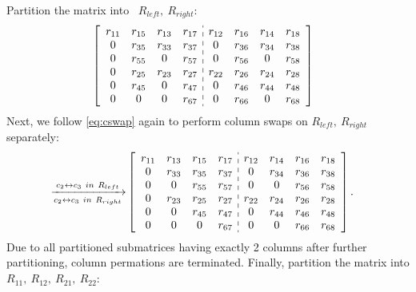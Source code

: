 \documentclass[12pt]{article}
\numberwithin{equation}{section}
\begin{document}
Partition the matrix into \ $R_{left}, \ R_{right}$:
 \begin{align*}
&\begin{bmatrix}
\begin{array}{cccc:cccc}
 r_{11} & r_{15} & r_{13} & r_{17} & r_{12} & r_{16} & r_{14} & r_{18}\\
 0      & r_{35} & r_{33} & r_{37} & 0      & r_{36} & r_{34} & r_{38}\\
 0      & r_{55} & 0      & r_{57} & 0      & r_{56} & 0      & r_{58}\\
 0      & r_{25} & r_{23} & r_{27} & r_{22} & r_{26} & r_{24} & r_{28}\\
 0      & r_{45} & 0      & r_{47} & 0      & r_{46} & r_{44} & r_{48}\\
 0      & 0      & 0      & r_{67} & 0      & r_{66} & 0      & r_{68}\\
\end{array}
\end{bmatrix}
\end{align*}
Next, we follow  \eqref{eq:cswap} again to perform column swaps
on $R_{left}, \ R_{right}$ separately:
\begin{align*}
\xrightarrow[c_{2} \leftrightarrow c_{3}\ in\ R_{right}]{c_{2} \leftrightarrow c_{3}\ in\ R_{left}}
&\begin{bmatrix}
\begin{array}{cccc:cccc}
 r_{11} & r_{13} & r_{15} & r_{17} & r_{12} & r_{14} & r_{16} & r_{18}\\
 0      & r_{33} & r_{35} & r_{37} & 0      & r_{34} & r_{36} & r_{38}\\
 0      & 0      & r_{55} & r_{57} & 0      & 0      & r_{56} & r_{58}\\
 0      & r_{23} & r_{25} & r_{27} & r_{22} & r_{24} & r_{26} & r_{28}\\
 0      & 0      & r_{45} & r_{47} & 0      & r_{44} & r_{46} & r_{48}\\
 0      & 0      & 0      & r_{67} & 0      & 0      & r_{66} & r_{68}\\
\end{array}
\end{bmatrix}.
\end{align*}
Due to all partitioned submatrices having exactly 2 columns after further partitioning, column permations are terminated. Finally, partition the matrix into \(R_{11}, \ R_{12}, \ R_{21}, \ R_{22}\):
\end{document}
